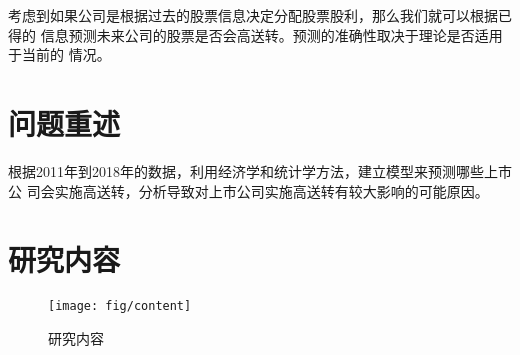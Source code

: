 \documentclass[../main]{subfiles}
\begin{document}
考虑到如果公司是根据过去的股票信息决定分配股票股利，那么我们就可以根据已得的
信息预测未来公司的股票是否会高送转。预测的准确性取决于理论是否适用于当前的
情况。

\section{问题重述}%
\label{sec:problem}

\begin{Exercise}[label = ex:1]
  根据2011年到2018年的数据，利用经济学和统计学方法，建立模型来预测哪些上市公
  司会实施高送转，分析导致对上市公司实施高送转有较大影响的可能原因。
\end{Exercise}

\section{研究内容}%
\label{sec:content}

\begin{figure}[htbp]
  \centering
  \texttt{[image: fig/content]}
  \caption{研究内容}%
  \label{fig:content}
\end{figure}
\end{document}
